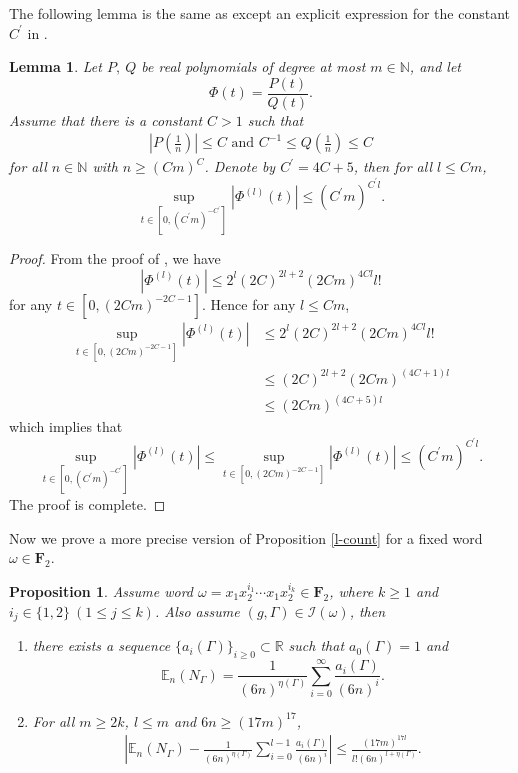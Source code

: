 \documentclass{amsart}
\theoremstyle{plain}
\newtheorem{proposition}[theorem]{Proposition}
\newtheorem{lemma}[theorem]{Lemma}
\theoremstyle{definition}
\theoremstyle{remark}
\begin{document}
The following lemma is the same as \cite[Lemma 2.2]{MPvH25} except an explicit expression for the constant $C^\prime$ in \cite[Lemma 2.2]{MPvH25}.
\begin{lemma}\label{l-poly}
    Let $P,\ Q$ be real polynomials of degree at most $m\in\mathbb{N}$, and let 
    $$\Phi(t)=\frac{P(t)}{Q(t)}.$$
    Assume that there is a constant $C>1$ such that 
    \begin{align}\label{e-cond}
    \left|P\left(\frac{1}{n}\right)\right|\leq C\text{ and }C^{-1}\leq Q\left(\frac{1}{n}\right)\leq C
    \end{align}
    for all $n\in\mathbb{N}$ with $n\geq (Cm)^C$. Denote by $C^\prime=4C+5$, then for all $l\leq Cm$,
    $$\sup\limits_{t\in\left[0,(C^\prime m)^{-C^\prime}\right]}\left|\Phi^{(l)}(t)\right|\leq (C^\prime m)^{C^\prime l}.$$
\end{lemma}
\begin{proof}
    From the proof of \cite[Lemma 2.2]{MPvH25}, we have 
    $$\left|\Phi^{(l)}(t)\right|\leq 2^l(2C)^{2l+2}(2Cm)^{4Cl}l!$$
    for any $t\in[0,(2Cm)^{-2C-1}]$. Hence for any $l\leq Cm$, 
    \begin{align*}
       \sup\limits_{t\in\left[0,(2C m)^{-2C-1}\right]}\left|\Phi^{(l)}(t)\right|&\leq 2^l(2C)^{2l+2}(2Cm)^{4Cl}l!\\
       &\leq (2C)^{2l+2}(2Cm)^{(4C+1)l}\\
       &\leq (2Cm)^{(4C+5)l}
    \end{align*}
    which implies that
    $$\sup\limits_{t\in\left[0,(C^\prime m)^{-C^\prime}\right]}\left|\Phi^{(l)}(t)\right|\leq\sup\limits_{t\in\left[0,(2C m)^{-2C-1}\right]}\left|\Phi^{(l)}(t)\right|\leq (C^\prime m)^{C^\prime l}.$$
    The proof is complete.
\end{proof}
Now we prove a more precise version of Proposition \ref{l-count} for a fixed word $\omega\in\textbf{F}_2$.
\begin{proposition}\label{l-poly-1}
    Assume word $\omega=x_1x_2^{i_1}\cdots x_1x_2^{i_k}\in\textbf{F}_2$, where $k\geq 1$ and $i_j\in\{1,2\}\ (1\leq j\leq k)$. Also assume  $(g,\Gamma)\in\mathcal{I}(\omega)$, then
    \begin{enumerate}
   \item   there exists a sequence $\{a_i(\Gamma)\}_{i\geq 0}\subset\mathbb{R}$ such that $a_0(\Gamma)=1$ and
   $$\mathbb{E}_n(N_\Gamma)=\frac{1}{(6n)^{\eta(\Gamma)}}\sum\limits_{i=0}^\infty \frac{a_i(\Gamma)}{(6n)^i}.$$
   \item For all $m\geq 2k$, $l\leq m$ and $6n\geq (17m)^{17}$,
    \begin{align*}
    \left|\mathbb{E}_n(N_\Gamma)-\frac{1}{(6n)^{\eta(\Gamma)}}\sum\limits_{i=0}^{l-1}\frac{a_i(\Gamma)}{(6n)^i}\right|\leq\frac{(17m)^{17l}}{l!(6n)^{l+\eta(\Gamma)}}.
\end{align*}
\end{enumerate}
\end{proposition}
\end{document}

